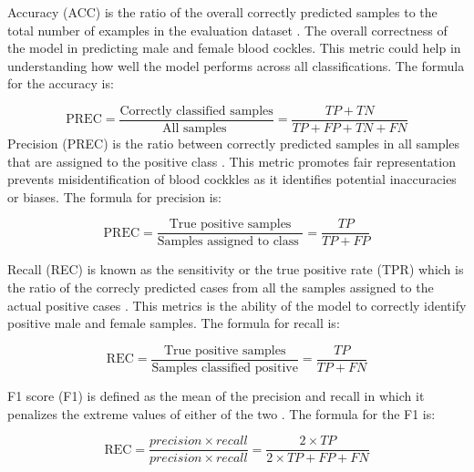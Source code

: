 Accuracy (ACC) is the ratio of the overall correctly predicted samples to the total number of examples in the evaluation dataset \cite{cui2020}. The overall correctness of the model in predicting male and female blood cockles. This metric could help in understanding how well the model performs across all classifications. The formula for the accuracy is: 

\begin{equation}
	\text{PREC} = \frac{\text{Correctly classified samples}} {\text{All samples }} = \frac{TP+ TN}{TP + FP + TN + FN}
	\label{eq:acc}
\end{equation}
Precision (PREC) is the ratio between correctly predicted samples in all samples that are assigned to the positive class \cite{cui2020}. This metric promotes fair representation prevents misidentification of blood cockkles as it identifies potential inaccuracies or biases. The formula for precision is:


\begin{equation}
	\text{PREC} = \frac{\text{True positive samples}} {\text{Samples assigned to class }} = \frac{TP}{TP + FP}
	\label{eq:prec}
\end{equation}

Recall (REC) is known as the sensitivity or the true positive rate (TPR) which is the ratio of the correcly predicted cases from all the samples assigned to the actual positive cases \cite{cui2020}. This metrics is the ability of the model to correctly identify positive male and female samples. The formula for recall is:

\begin{equation}
	\text{REC} = \frac{\text{True positive samples}} {\text{Samples classified positive}} = \frac{TP}{TP + FN}
	\label{eq:rec}
\end{equation}

F1 score (F1) is defined as the mean of the precision and recall in which it penalizes the extreme values of either of the two \cite{cui2020}. The formula for the F1 is: 

\begin{equation}
	\text{REC} = \frac{ precision \times recall }{precision \times recall }= \frac{2 \times TP}{2 \times TP + FP + FN}
	\label{eq:f1}
\end{equation}

